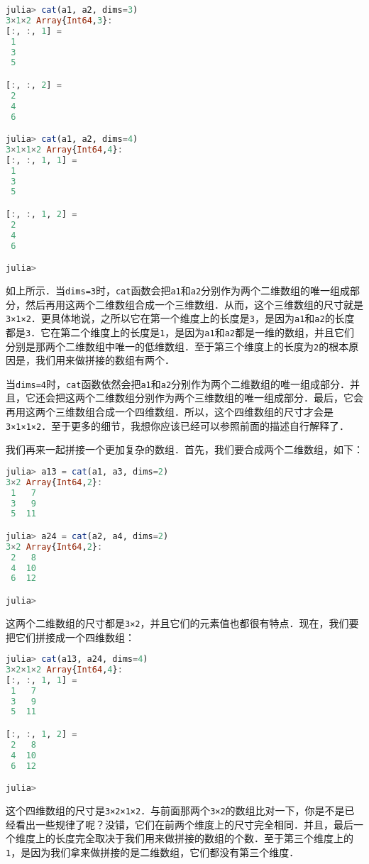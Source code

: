 \begin{lstlisting}[language=julia]
julia> cat(a1, a2, dims=3)
3×1×2 Array{Int64,3}:
[:, :, 1] =
 1
 3
 5

[:, :, 2] =
 2
 4
 6

julia> cat(a1, a2, dims=4)
3×1×1×2 Array{Int64,4}:
[:, :, 1, 1] =
 1
 3
 5

[:, :, 1, 2] =
 2
 4
 6

julia> 
\end{lstlisting}

如上所示．当\verb|dims=3|时，\verb|cat|函数会把\verb|a1|和\verb|a2|分别作为两个二维数组的唯一组成部分，然后再用这两个二维数组合成一个三维数组．从而，这个三维数组的尺寸就是\verb|3×1×2|．更具体地说，之所以它在第一个维度上的长度是\verb|3|，是因为\verb|a1|和\verb|a2|的长度都是\verb|3|．它在第二个维度上的长度是\verb|1|，是因为\verb|a1|和\verb|a2|都是一维的数组，并且它们分别是那两个二维数组中唯一的低维数组．至于第三个维度上的长度为\verb|2|的根本原因是，我们用来做拼接的数组有两个．

当\verb|dims=4|时，\verb|cat|函数依然会把\verb|a1|和\verb|a2|分别作为两个二维数组的唯一组成部分．并且，它还会把这两个二维数组分别作为两个三维数组的唯一组成部分．最后，它会再用这两个三维数组合成一个四维数组．所以，这个四维数组的尺寸才会是\verb|3×1×1×2|．至于更多的细节，我想你应该已经可以参照前面的描述自行解释了．

我们再来一起拼接一个更加复杂的数组．首先，我们要合成两个二维数组，如下：

\begin{lstlisting}[language=julia]
julia> a13 = cat(a1, a3, dims=2)
3×2 Array{Int64,2}:
 1   7
 3   9
 5  11

julia> a24 = cat(a2, a4, dims=2)
3×2 Array{Int64,2}:
 2   8
 4  10
 6  12

julia> 
\end{lstlisting}

这两个二维数组的尺寸都是\verb|3×2|，并且它们的元素值也都很有特点．现在，我们要把它们拼接成一个四维数组：

\begin{lstlisting}[language=julia]
julia> cat(a13, a24, dims=4)
3×2×1×2 Array{Int64,4}:
[:, :, 1, 1] =
 1   7
 3   9
 5  11

[:, :, 1, 2] =
 2   8
 4  10
 6  12

julia> 
\end{lstlisting}

这个四维数组的尺寸是\verb|3×2×1×2|．与前面那两个\verb|3×2|的数组比对一下，你是不是已经看出一些规律了呢？没错，它们在前两个维度上的尺寸完全相同．并且，最后一个维度上的长度完全取决于我们用来做拼接的数组的个数．至于第三个维度上的\verb|1|，是因为我们拿来做拼接的是二维数组，它们都没有第三个维度．

